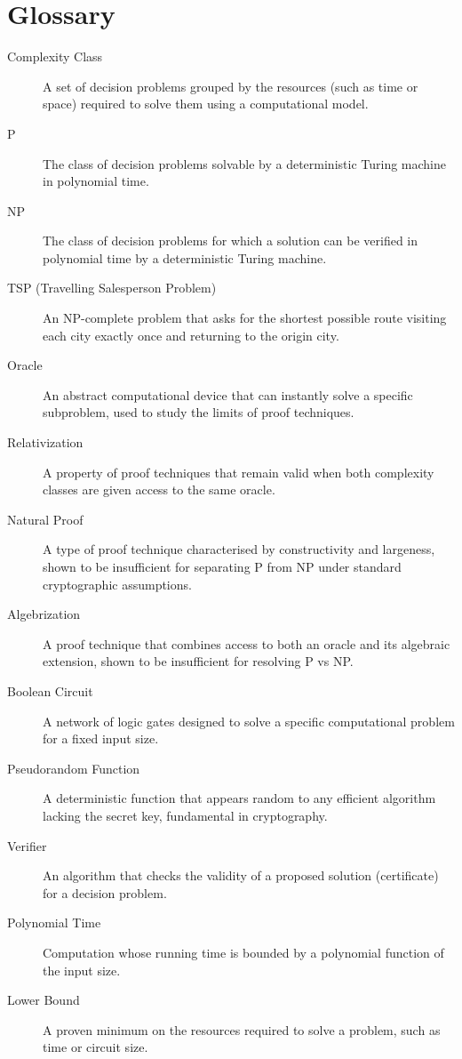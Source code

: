 \documentclass[12pt]{report}
\begin{document}



\newpage
\chapter*{Glossary}
\begin{description}
    \item[Complexity Class] A set of decision problems grouped by the resources (such as time or space) required to solve them using a computational model.
    \item[P] The class of decision problems solvable by a deterministic Turing machine in polynomial time.
    \item[NP] The class of decision problems for which a solution can be verified in polynomial time by a deterministic Turing machine.
    \item[TSP (Travelling Salesperson Problem)] An NP-complete problem that asks for the shortest possible route visiting each city exactly once and returning to the origin city.
    \item[Oracle] An abstract computational device that can instantly solve a specific subproblem, used to study the limits of proof techniques.
    \item[Relativization] A property of proof techniques that remain valid when both complexity classes are given access to the same oracle.
    \item[Natural Proof] A type of proof technique characterised by constructivity and largeness, shown to be insufficient for separating P from NP under standard cryptographic assumptions.
    \item[Algebrization] A proof technique that combines access to both an oracle and its algebraic extension, shown to be insufficient for resolving P vs NP.
    \item[Boolean Circuit] A network of logic gates designed to solve a specific computational problem for a fixed input size.
    \item[Pseudorandom Function] A deterministic function that appears random to any efficient algorithm lacking the secret key, fundamental in cryptography.
    \item[Verifier] An algorithm that checks the validity of a proposed solution (certificate) for a decision problem.
    \item[Polynomial Time] Computation whose running time is bounded by a polynomial function of the input size.
    \item[Lower Bound] A proven minimum on the resources required to solve a problem, such as time or circuit size.
\end{description}
\end{document}
